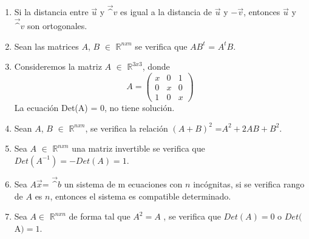 \bigskip
\begin{enumerate}

\item
Si la distancia entre $\vec{u}$ y $\vec^{v}$ es igual a la distancia de $\vec{u}$ y $-\vec{v}$, entonces $\vec{u}$ y $\vec^{v}$ son ortogonales.

\item

Sean las matrices $A$, $B$ $\in$  $\mathbb{R}^{nxn}$ se verifica que $A$$B^t$ = $A^t$$B$.

\item

Consideremos la matriz $A$ $\in$ $\mathbb{R}^{3x3}$, donde
\[A= \left(\begin{array}{ccc}x & 0 & 1\\ 0 & x & 0\\ 1 & 0 & x
\end{array}
 \right)
 \]
La ecuación Det(A) = 0, no tiene solución.

\item

Sean $A$, $B$ $\in$ $\mathbb{R}^{nxn}$, se verifica la relación $(A + B)^2$ =$ A^2 + 2AB + B^2$.

\item

Sea $A$ $\in$ $\mathbb{R}^{nxn}$ una matriz invertible se verifica que $Det(A^{-1}) = - Det(A) = 1$.

\item

 Sea $A\vec{x}$= $\vec^{b}$ un sistema de m ecuaciones con $n$ incógnitas, si se verifica rango de  $A$ es $n$,
entonces el sistema es compatible determinado.

\item

 Sea $A \in$ $\mathbb{R}^{nxn}$  de forma tal que $A^2 = A$ , se verifica que $Det(A) = 0$ o $Det($A$) = 1$.

\end{enumerate}


\vspace{.5cm}
















